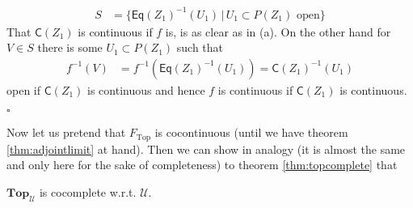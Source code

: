 \begin{prf}
\begin{enumerate}
\begin{align*}
  S
  &=
  \lbrace
      \mathsf{Eq}(Z_{1})^{-1}(U_{1})
    \,
    \vert
    \,
      U_{1}
      \subset
      P(Z_{1})
      \text{ open}
  \rbrace
\end{align*}
That $\mathsf{C}(Z_{1})$ is continuous if $f$ is, is as clear as in (a). On the other hand for $V \in S$ there is some $U_{1} \subset P(Z_{1})$ such that
\begin{align*}
  f^{-1}(V)
  &=
  f^{-1}(\mathsf{Eq}(Z_{1})^{-1}(U_{1}))
  =
  \mathsf{C}(Z_{1})^{-1}(U_{1})
\end{align*}
open if $\mathsf{C}(Z_{1})$ is continuous and hence $f$ is continuous if $\mathsf{C}(Z_{1})$ is continuous.
\end{enumerate}
\phantom{proven}
\hfill
$\square$
\end{prf}
Now let us pretend that $F_{\mathrm{Top}}$ is cocontinuous (until we have theorem \ref{thm:adjointlimit} at hand). Then we can show in analogy (it is almost the same and only here for the sake of completeness) to theorem \ref{thm:topcomplete} that
\\
\begin{thm}
\label{thm:topcocomplete}
$\mathbf{Top}_{\mathcal{U}}$ is cocomplete w.r.t. $\mathcal{U}$.
\end{thm}
